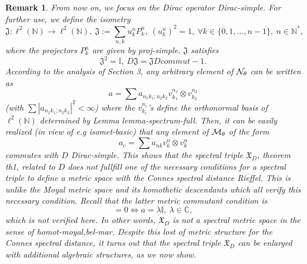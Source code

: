 \documentclass[10pt]{book}
\theoremstyle{break}
\newtheorem{remark}{Remark}
\begin{document}
\begin{remark}
From now on, we focus on the Dirac operator {Dirac-simple}. For further use, we define the isometry
\begin{equation}
\mathfrak{J}:\ell^2(\mathbb{N})\to\ell^2(\mathbb{N}),\ \mathfrak{J}:=\sum_{n,k}u^n_kP^n_k,\ (u^n_k)^2=1,\ \forall k\in\{0,1,...,n-1\},\ n\in\mathbb{N}^*,
\end{equation}
where the projectors $P^n_k$ are given by {proj-simple}. $\mathfrak{J}$ satisfies
\begin{equation}
\mathfrak{J}^2=\mathbb{I},\ D\mathfrak{J}=\mathfrak{J}D{commut-1}. 
\end{equation}
According to the analysis of Section 3, any arbitrary element of ${\cal{N}}_\theta$ can be written as 
\begin{equation}
a=\sum a_{n_1k_1;n_2k_2}v^{n_1}_{k_1}\otimes v^{n_2}_{k_2}
\end{equation}
(with $\sum |a_{n_1k_1;n_2k_2} |^2<\infty$) where the $v^{n_i}_{k_i}$'s define the orthonormal basis of $\ell^2(\mathbb{N})$ determined by Lemma {lemma-spectrum-full}. Then, it can be easily realized (in view of e.g {isomet-basic}) that any element of ${\cal{M}}_\theta$ of the form 
\begin{equation}
a_c=\sum a_{nk}v^n_k\otimes v^n_k 
\end{equation}
commutes with $D$ {Dirac-simple}. This shows that the spectral triple $\mathfrak{X}_D$, theorem {th1}, related to $D$ does not fullfill one of the necessary conditions for a spectral triple to define a metric space with the Connes spectral distance {Rieffel}. This is unlike the Moyal metric space and its homothetic descendants which all verify this necessary condition. Recall that the latter metric commutant condition is 
\begin{equation}
[D,\eta(a)]=0\iff a=\lambda\mathbb{I},\ \lambda\in\mathbb{C},
\end{equation}
which is not verified here. In other words, $\mathfrak{X}_D$ is not a spectral metric space in the sense of {homot-moyal,bel-mar}. Despite this lost of metric structure for the Connes spectral distance, it turns out that the spectral triple $\mathfrak{X}_D$ can be enlarged with additional algebraic structures, as we now show.
\end{remark}
\end{document}
